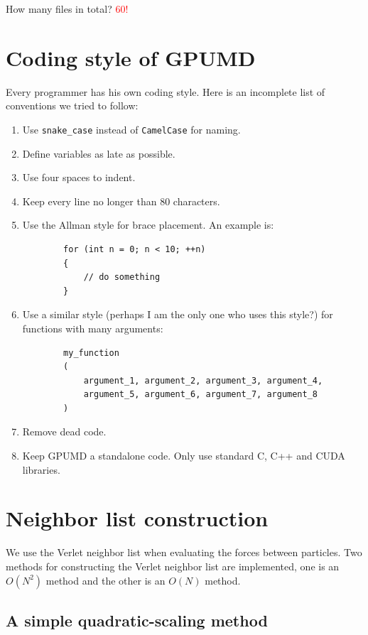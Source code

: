 \documentclass[12pt,a4paper]{report}
\begin{document}
How many files in total? \textcolor{red}{60!}


\section{Coding style of GPUMD}

Every programmer has his own coding style. Here is an incomplete list of conventions we tried to follow:
\begin{enumerate}
\item Use \verb"snake_case" instead of \verb"CamelCase" for naming.
\item Define variables as late as possible.
\item Use four spaces to indent. 
\item Keep every line no longer than 80 characters.
\item Use the Allman style for brace placement. An example is:
    \begin{verbatim}
        for (int n = 0; n < 10; ++n) 
        {
            // do something
        }
    \end{verbatim}
\item Use a similar style (perhaps I am the only one who uses this style?) for functions with many arguments:
    \begin{verbatim}
        my_function
        (
            argument_1, argument_2, argument_3, argument_4, 
            argument_5, argument_6, argument_7, argument_8
        )
    \end{verbatim}
\item Remove dead code.
\item Keep GPUMD a standalone code. Only use standard C, C++ and CUDA libraries.
\end{enumerate}


\section{Neighbor list construction}


We use the Verlet neighbor list when evaluating the forces between particles. Two methods for constructing the Verlet neighbor list are implemented, one is an $O(N^2)$ method and the other is an $O(N)$ method.


\subsection{A simple quadratic-scaling method}
\end{document}
